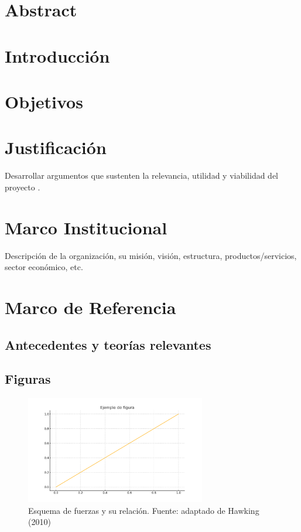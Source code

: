 \documentclass[12pt]{article}
\newcommand{\chapterbreak}{\clearpage \thispagestyle{fancy}}
\begin{document}
\chapterbreak
\section*{Abstract}


\chapterbreak
\tableofcontents
\newpage

\listoffigures
\listoftables

\chapterbreak
\section{Introducción}


\chapterbreak
\section{Objetivos}


\chapterbreak
\section{Justificaci\'on}
Desarrollar argumentos que sustenten la relevancia, utilidad y viabilidad del proyecto \parencite{hawking2010}.

\chapterbreak

\section{Marco Institucional}
Descripci\'on de la organizaci\'on, su misi\'on, visi\'on, estructura, productos/servicios, sector econ\'omico, etc.

\chapterbreak

\section{Marco de Referencia}
\subsection*{Antecedentes y teor\'ias relevantes}
\subsection*{Figuras}
\begin{figure}[H]
\centering
\includegraphics[width=0.7\textwidth]{assets/figura1.png}
\caption{Esquema de fuerzas y su relaci\'on. Fuente: adaptado de Hawking (2010)}
\end{figure}
\end{document}
